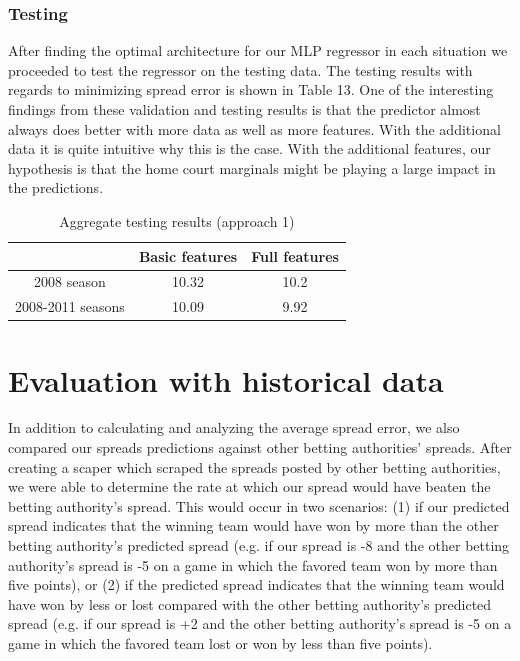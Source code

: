 \documentclass{article}
\begin{document}
\subsubsection{Testing}
After finding the optimal architecture for our MLP regressor in each situation we proceeded to test the regressor on the testing data. The testing results with regards to minimizing spread error is shown in Table 13. One of the interesting findings from these validation and testing results is that the predictor almost always does better with more data as well as more features. With the additional data it is quite intuitive why this is the case. With the additional features, our hypothesis is that the home court marginals might be playing a large impact in the predictions.

\begin{table}
  \begin{center}
    \begin{tabular}{ | c | c | c |}
      \hline
            &            	Basic features & 	Full features \\ \hline
	2008 season  &     	10.32 & 	10.2    \\ \hline
	2008-2011 seasons &  10.09&  9.92 \\ \hline


    \end{tabular}
  \end{center}
  \caption{Aggregate testing results (approach 1)}
\end{table}

\section{Evaluation with historical data}
In addition to calculating and analyzing the average spread error, we also compared our spreads predictions against other betting authorities' spreads. After creating a scaper which scraped the spreads posted by other betting authorities, we were able to determine the rate at which our spread would have beaten the betting authority's spread. This would occur in two scenarios: (1) if our predicted spread indicates that the winning team would have won by more than the other betting authority's predicted spread (e.g. if our spread is -8 and the other betting authority's spread is -5 on a game in which the favored team won by more than five points), or (2) if the predicted spread indicates that the winning team would have won by less or lost compared with the other betting authority's predicted spread (e.g. if our spread is +2 and the other betting authority's spread is -5 on a game in which the favored team lost or won by less than five points).
\end{document}
